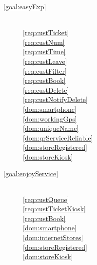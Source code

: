 \begin{description}
        \item[\ref{goal:easyExp}]  ~\\
        \ref{req:custTicket}  ~\\
        \ref{req:custNum}  ~\\
        \ref{req:custTime}  ~\\
        \ref{req:custLeave}  ~\\
        \ref{req:custFilter}  ~\\
        \ref{req:custBook}  ~\\
        \ref{req:custDelete}  ~\\
        \ref{req:custNotifyDelete}  ~\\

        \ref{dom:smartphone}  ~\\
        \ref{dom:workingGps}  ~\\
        \ref{dom:uniqueName}  ~\\
        \ref{dom:qrServiceReliable}  ~\\
        \ref{dom:storeRegistered}  ~\\
        \ref{dom:storeKiosk}  ~\\


        \item[\ref{goal:enjoyService}]  ~\\

        \ref{req:custQueue}  ~\\
        \ref{req:custTicketKiosk}  ~\\
        \ref{req:custBook}  ~\\

        \ref{dom:smartphone}  ~\\
        \ref{dom:internetStores}  ~\\
        \ref{dom:storeRegistered}  ~\\
        \ref{dom:storeKiosk}  ~\\



\end{description}
